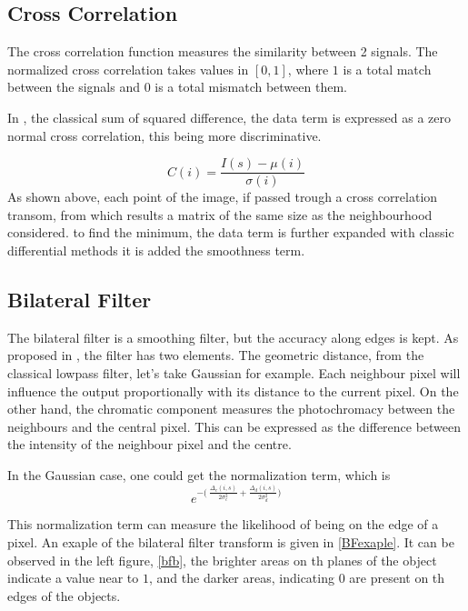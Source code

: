 \documentclass[12pt,a4paper,twoside]{report}
\begin{document}
\subsection{Cross Correlation}
The cross correlation function measures the similarity between 2 signals.
The normalized cross correlation takes values in $[0,1]$, where $1$ is a total match between the signals and $0$ is a total mismatch between them.

In \cite{drulea2013}, the classical sum of squared difference, the data term is expressed as a zero normal cross correlation, this being more discriminative. 
 
 \begin{equation}
 C(i) = \frac{I(s)- \mu(i)}{\sigma(i)}
 \end{equation}
As shown above, each point of the image, if passed trough a cross correlation transom, from which results a matrix of the same size as the neighbourhood considered. to find the minimum, the data term is further expanded with classic differential methods it is added the smoothness term.

\subsection{Bilateral Filter} \label{bf}
The bilateral filter is a smoothing filter, but the accuracy along edges is kept. 
As proposed in \cite{tomasi1998bilateral}, the filter has two elements. The geometric distance, from the classical lowpass filter, let's take Gaussian for example. Each neighbour pixel will influence the output proportionally with its distance to the current pixel. On the other hand, the chromatic component measures the photochromacy between the neighbours and the central pixel. This can be expressed as the difference between the intensity of the neighbour pixel and the centre. 

In the Gaussian case, one could get the normalization term, which is
\begin{equation} \label{bilateralFilterTerm}
	e^{-\big(\ \frac{\Delta_c(i,s)}{2\sigma_c^2}+ \frac{\Delta_d(i,s)}{2\sigma_d^2}\big)}
\end{equation}

This normalization term can measure the likelihood of being on the edge of a pixel. An exaple of the bilateral filter transform is given in \ref{BFexaple}. It can be observed in the left figure, \ref{bfb}, the brighter areas on th planes of the object indicate a value near to $1$, and the darker areas, indicating $0$ are present on th edges of the objects.
\end{document}
